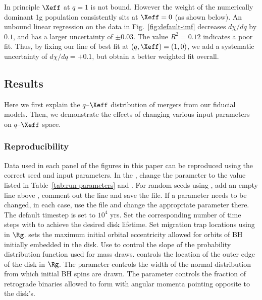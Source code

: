 In principle $\Xeff$ at $q=1$ is not bound.
However the weight of the numerically dominant 1g population consistently sits at $\Xeff=0$ (as shown below).
An unbound linear regression on the data in Fig.~\ref{fig:default-imf} decreases $d\chi/dq$ by $0.1$, and has a larger uncertainty of $\pm0.03$.
The value $R^2=0.12$ indicates a poor fit.
Thus, by fixing our line of best fit at $(q,\Xeff)=(1,0)$, we add a systematic uncertainty of $d\chi/dq=+0.1$, but obtain a better weighted fit overall.


\subsection{Results}
\label{sec:results-ch2}
Here we first explain the $q$--$\Xeff$ distribution of mergers from our fiducial models.
Then, we demonstrate the effects of changing various input parameters on $q$--$\Xeff$ space.

\subsubsection{Reproducibility}
Data used in each panel of the figures in this paper can be reproduced using the correct seed and input parameters.
In the , change the  parameter to the value listed in Table~\ref{tab:run-parameters} and .
For random seeds using , add an empty line above , comment out the  line and save the file.
If a parameter needs to be changed, in each case, use the  file and change the appropriate parameter there.
The default timestep is set to $10^4$ yrs.
Set the corresponding number of time steps with  to achieve the desired disk lifetime.
Set migration trap locations using  in $\Rg$.
 sets the maximum initial orbital eccentricity allowed for orbits of BH initially embedded in the disk.
Use  to control the slope of the probability distribution function used for mass draws.
 controls the location of the outer edge of the disk in $\Rg$.
The parameter  controls the width of the normal distribution from which initial BH spins are drawn.
The parameter  controls the fraction of retrograde binaries allowed to form with angular momenta pointing opposite to the disk's.

